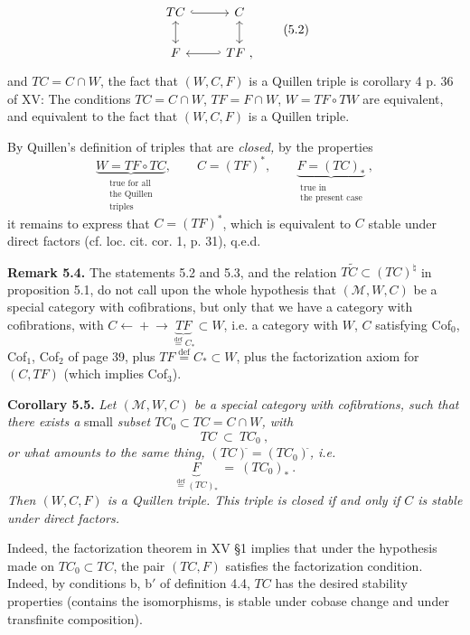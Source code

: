 \documentclass[11pt]{article}
\newcommand{\printedpage}[1]{\marginpar{\footnotesize p.~#1}}
\newcommand{\msp}[1]{\marginpar{\footnotesize [#1]}}
\newcommand{\cl}{^{\tilde{}}}%
\newcommand{\defeq}{\overset{\text{def}}{=}}
\begin{document}
\printedpage{44}
\[
\begin{tikzcd}
TC \arrow[r, hook] \arrow[d, leftrightarrow] & C \arrow[d, leftrightarrow] \\
F & TF \arrow[l, hook'] \ ,
\end{tikzcd}
\tag*{(5.2)}
\]
and $TC = C \cap W$, the fact that $(W, C, F)$ is a Quillen triple is corollary 4 p. 36 of XV: The conditions $TC = C \cap W$, $TF = F \cap W$, $W = TF \circ TW$ are equivalent, and equivalent to the fact that $(W, C, F)$ is a Quillen triple.

By Quillen's definition of triples that are \textit{closed,} by the properties
\[
\underbrace{W = TF \circ TC}_{\substack{\text{true for all}\\ \text{the Quillen}\\ \text{triples}}}, \qquad C = (TF)^*, \qquad \underbrace{F = (TC)_*}_{\substack{\text{true in}\\ \text{the present case}}}\ , %
\]
it remains to express that $C = (TF)^*$, which is equivalent to $C$ stable under direct factors (cf. loc. cit. cor. 1, p. 31), q.e.d.

\textbf{Remark 5.4.} The statements 5.2 and 5.3, and the relation $T\tilde{C} \subset (TC)^\natural$ in proposition 5.1, do not call upon the whole hypothesis that $(\mathcal{M}, W, C)$ be a special category with cofibrations, but only that we have a category with cofibrations, with $C \mathrel{\leftarrow\!\!\!+\!\!\!\rightarrow} \underbrace{TF}_{\defeq C_*} \subset W$, %
\msp{page 89}
i.e. a category with $W$, $C$ satisfying Cof$_0$, Cof$_1$, Cof$_2$ of page 39, plus $TF \defeq C_* \subset W$, plus the factorization axiom for $(C, TF)$ (which implies Cof$_3$).

\textbf{Corollary 5.5.} \textit{Let $(\mathcal{M}, W, C)$ be a special category with cofibrations, such that there exists a} small \textit{subset $TC_0 \subset TC = C \cap W$, with}
\[
TC \ \subset \ TC_0\cl\ ,
\tag*{(5.5.1)}
\]
\textit{or what amounts to the same thing, $(TC)\cl = (TC_0)\cl$, i.e.}
\[
\underbrace{F}_{\defeq (TC)_*} \ = \ (TC_0)_*\ .
\tag*{(5.5.2)}
\]
\textit{Then $(W, C, F)$ is a Quillen triple. This triple is closed if and only if $C$ is stable under direct factors.}

Indeed, the factorization theorem in XV §1 implies that under the hypothesis made on $TC_0 \subset TC$, the pair $(TC, F)$ satisfies the factorization condition. Indeed, by conditions b, b$'$ of definition 4.4, $TC$ has the desired stability properties (contains the isomorphisms, is stable under cobase change and under transfinite composition).
\end{document}
